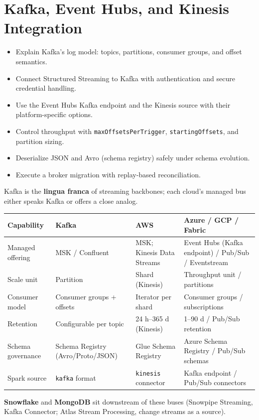 \chapter{Kafka, Event Hubs, and Kinesis Integration}
%
%
\begin{objectives}
\begin{itemize}
    \item Explain Kafka's log model: topics, partitions, consumer groups, and offset semantics.
    \item Connect Structured Streaming to Kafka with authentication and secure credential handling.
    \item Use the Event Hubs Kafka endpoint and the Kinesis source with their platform-specific options.
    \item Control throughput with \texttt{maxOffsetsPerTrigger}, \texttt{startingOffsets}, and partition sizing.
    \item Deserialize JSON and Avro (schema registry) safely under schema evolution.
    \item Execute a broker migration with replay-based reconciliation.
\end{itemize}
\end{objectives}

\begin{crosscloud}
Kafka is the \textbf{lingua franca} of streaming backbones; each cloud's managed bus either speaks
Kafka or offers a close analog.

\vspace{2mm}
{\footnotesize
\begin{tabular}{@{}p{3.0cm}p{3.4cm}p{3.2cm}p{3.2cm}@{}}
\toprule
\textbf{Capability} & \textbf{Kafka} & \textbf{AWS} & \textbf{Azure / GCP / Fabric} \\
\midrule
Managed offering & MSK / Confluent & MSK; Kinesis Data Streams & Event Hubs (Kafka endpoint) / Pub/Sub / Eventstream \\
Scale unit & Partition & Shard (Kinesis) & Throughput unit / partitions \\
Consumer model & Consumer groups + offsets & Iterator per shard & Consumer groups / subscriptions \\
Retention & Configurable per topic & 24 h--365 d (Kinesis) & 1--90 d / Pub/Sub retention \\
Schema governance & Schema Registry (Avro/Proto/JSON) & Glue Schema Registry & Azure Schema Registry / Pub/Sub schemas \\
Spark source & \texttt{kafka} format & \texttt{kinesis} connector & Kafka endpoint / Pub/Sub connectors \\
\bottomrule
\end{tabular}}

\vspace{1mm}
\textbf{Snowflake} and \textbf{MongoDB} sit downstream of these buses (Snowpipe Streaming, Kafka
Connector; Atlas Stream Processing, change streams as a source).
\end{crosscloud}

